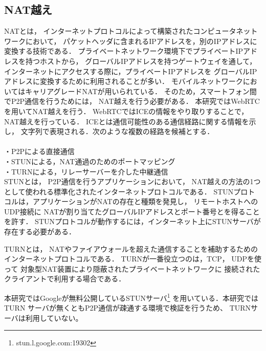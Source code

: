 \documentclass[sotsuron]{jcsie}
\begin{document}
\subsection{NAT越え}
NATとは，
インターネットプロトコルによって構築されたコンピュータネットワークにおいて，
パケットヘッダに含まれるIPアドレスを，別のIPアドレスに変換する技術である．
プライベートネットワーク環境下でプライベートIPアドレスを持つホストから，
グローバルIPアドレスを持つゲートウェイを通して，
インターネットにアクセスする際に，プライベートIPアドレスを
グローバルIPアドレスに変換するために利用されることが多い．
モバイルネットワークにおいてはキャリアグレードNATが用いられている．
そのため，スマートフォン間でP2P通信を行うためには，
NAT越えを行う必要がある．
本研究ではWebRTCを用いてNAT越えを行う．
WebRTCではICEの情報をやり取りすることで，NAT越えを行っている．
ICEとは通信可能性のある通信経路に関する情報を示し，
文字列で表現される．次のような複数の経路を候補とする．\\\\
・P2Pによる直接通信\\
・STUNによる，NAT通過のためのポートマッピング\\
・TURNによる，リレーサーバーを介した中継通信\\

STUN\cite{wing2008session}とは，
P2P通信を行うアプリケーションにおいて，
NAT越えの方法の1つとして使われる標準化されたインターネットプロトコルである．
STUNプロトコルは，アプリケーションがNATの存在と種類を発見し，
リモートホストへのUDP接続に
NATが割り当てたグローバルIPアドレスとポート番号とを得ることを許す．
STUNプロトコルが動作するには，インターネット上にSTUNサーバが存在する必要がある．

TURN\cite{matthews2010traversal}とは，
NATやファイアウォールを超えた通信することを補助するための
インターネットプロトコルである．
TURNが一番役立つのは，TCP， UDPを使って
対象型NAT装置により隠蔽されたプライベートネットワークに
接続されたクライアントで利用する場合である．

本研究ではGoogleが無料公開しているSTUNサーバ\footnote{stun.l.google.com:19302}
を用いている．本研究ではTURN
サーバが無くともP2P通信が疎通する環境で検証を行うため、
TURNサーバは利用していない。
\end{document}
